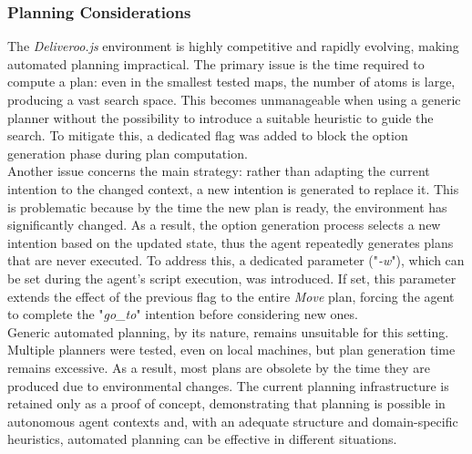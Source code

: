         \subsubsection{Planning Considerations}
            The \textit{Deliveroo.js} environment is highly competitive and rapidly evolving, making automated planning impractical. The primary issue is the time required to compute a plan: even in the smallest tested maps, the number of atoms is large, producing a vast search space. This becomes unmanageable when using a generic planner without the possibility to introduce a suitable heuristic to guide the search. To mitigate this, a dedicated flag was added to block the option generation phase during plan computation.
            \medskip\\
            Another issue concerns the main strategy: rather than adapting the current intention to the changed context, a new intention is generated to replace it. This is problematic because by the time the new plan is ready, the environment has significantly changed. As a result, the option generation process selects a new intention based on the updated state, thus the agent repeatedly generates plans that are never executed. To address this, a dedicated parameter ("\textit{-w}"), which can be set during the agent's script execution, was introduced. If set, this parameter extends the effect of the previous flag to the entire \textit{Move} plan, forcing the agent to complete the "\textit{go\_to}" intention before considering new ones.
            \medskip\\
            Generic automated planning, by its nature, remains unsuitable for this setting. Multiple planners were tested, even on local machines, but plan generation time remains excessive. As a result, most plans are obsolete by the time they are produced due to environmental changes. The current planning infrastructure is retained only as a proof of concept, demonstrating that planning is possible in autonomous agent contexts and, with an adequate structure and domain-specific heuristics, automated planning can be effective in different situations.

